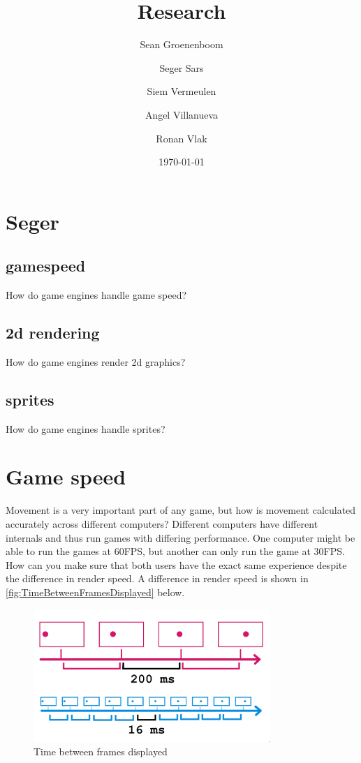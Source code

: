 \documentclass{article} %
\title{Research} %
\author{Sean Groenenboom \and Seger Sars \and Siem Vermeulen \and Angel Villanueva \and Ronan Vlak} %
\date{\today} %
\begin{document}
\maketitle %
\newpage

\tableofcontents %
\newpage

\section{Seger}
\subsection{gamespeed}
How do game engines handle game speed?
\subsection{2d rendering}
How do game engines render 2d graphics?
\subsection{sprites}
How do game engines handle sprites?
\newpage
\section{Game speed}
Movement is a very important part of any game, but how is movement calculated accurately across different computers?
Different computers have different internals and thus run games with differing performance.
One computer might be able to run the games at 60FPS, but another can only run the game at 30FPS.
How can you make sure that both users have the exact same experience despite the difference in render speed.
A difference in render speed is shown in \autoref{fig:TimeBetweenFramesDisplayed} below.
\begin{figure}[h!]
    \centering
    \includegraphics[width=0.8\textwidth]{time_between_frames.png}
    \caption{Time between frames displayed}
    \label{fig:TimeBetweenFramesDisplayed}
\end{figure}
\end{document}
